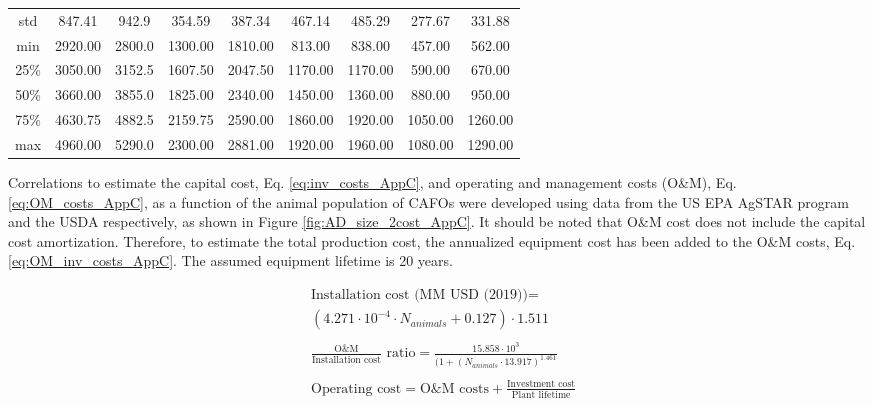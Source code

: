 \begin{refsection}[referencesCh4]
\begin{table}[h]
{\begin{tabular}{ccccccccc}
			std   &   847.41 &       942.9 &    354.59 &               387.34 &              467.14 &              485.29 &               277.67 &               331.88    \\      
			min   &   2920.00 &     2800.0 &    1300.00 &              1810.00 &              813.00 &              838.00 &               457.00 &               562.00   \\    
			25\%   &  3050.00 &     3152.5 &    1607.50 &              2047.50 &             1170.00 &             1170.00 &               590.00 &               670.00   \\  
			50\%   & 3660.00 &     3855.0 &     1825.00 &              2340.00 &             1450.00 &             1360.00 &               880.00 &               950.00   \\
			75\%   & 4630.75 &      4882.5 &    2159.75 &              2590.00 &             1860.00 &             1920.00 &              1050.00 &              1260.00   \\
			max   &     4960.00 &   5290.0 &     2300.00 &              2881.00 &             1920.00 &             1960.00 &              1080.00 &              1290.00  \\
			\bottomrule
	\end{tabular}}
\end{table}

Correlations to estimate the capital cost, Eq. \ref{eq:inv_costs_AppC}, and operating and management costs (O\&M), Eq. \ref{eq:OM_costs_AppC}, as a function of the animal population of CAFOs were developed using data from the US EPA AgSTAR program \citep{AgSTAR2003} and the USDA \citep{USDA_OM} respectively, as shown in Figure \ref{fig:AD_size_2cost_AppC}. It should be noted that O\&M cost does not include the capital cost amortization. Therefore, to estimate the total production cost, the annualized equipment cost has been added to the O\&M costs, Eq.  \ref{eq:OM_inv_costs_AppC}. The assumed equipment lifetime is 20 years.

\begin{align} 
& \text{Installation cost (MM USD (2019))} = \label{eq:inv_costs_AppC} \\
& \left(4.271 \cdot 10^{-4} \cdot N_{animals}+0.127\right) \cdot 1.511 \nonumber \\ \nonumber\\
& \frac{\text{O\&M}} {\text{Installation cost}} \text{ ratio} = \frac{15.858\cdot 10^{3}}{(1+\left(N_{animals} \cdot 13.917\right)^{1.461}} \label{eq:OM_costs_AppC}\\ \nonumber\\
& \text{Operating cost} = \text{O\&M costs} + \frac{\text{Investment cost}}{\text{Plant lifetime}} \label{eq:OM_inv_costs_AppC}
\end{align}


\end{refsection}
